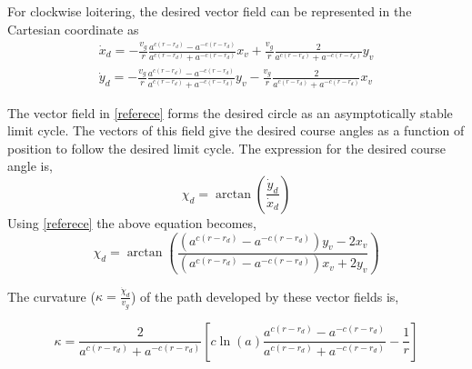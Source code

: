 \documentclass[Afour,sagev,times]{sagej}
\begin{document}
For clockwise loitering, the desired vector field can be represented in the Cartesian coordinate as
\begin{equation}\label{referece}
\begin{split}
\textstyle\dot{x}_{d}  =  - \frac{v_{g}}{r}\frac{{{a^{c(r - {r_d})}} - {a^{ - c(r - {r_d})}}}}{{{a^{c(r - {r_d})}} + {a^{ - c(r - {r_d})}}}}x_v +\frac{v_{g}}{r}\frac{2}{{{a^{c(r - {r_d})}} + {a^{ - c(r - {r_d})}}}}y_v \\
\textstyle\dot{y}_{d}  =  - \frac{v_{g}}{r}\frac{{{a^{c(r - {r_d})}} - {a^{ - c(r - {r_d})}}}}{{{a^{c(r - {r_d})}} + {a^{ - c(r - {r_d})}}}}y_v - \frac{v_{g}}{r}\frac{2}{{{a^{c(r - {r_d})}} + {a^{ - c(r - {r_d})}}}}x_v
\end{split}
\end{equation}

The vector field in \eqref{referece} forms the desired circle as an asymptotically stable limit cycle. The vectors of this field give the desired course angles as a function of position to follow the desired limit cycle. The expression for the desired course angle is,
\begin{equation}
{\chi _ {d}} = \arctan \left( {\frac{{\dot{y}_{d} }}{{\dot{x}_{d} }}} \right)
\end{equation}
Using \eqref{referece} the above equation becomes,
\begin{equation}
{\chi _{d}} = \arctan \left( {\frac{{\left( {{a^{c(r - {r_d})}} - {a^{ - c(r - {r_d})}}} \right)y_v - 2x_v}}{{\left( {{a^{c(r - {r_d})}} - {a^{ - c(r - {r_d})}}} \right)x_v + 2y_v}}} \right)
\end{equation}

The curvature ($\kappa = \frac{{{{\dot \chi }_d}}}{v_{g}}$) of the path developed by these vector fields is, 

\begin{equation}\label{eq15}
\kappa = \frac{2}{{{a^{c(r - {r_d})}} + {a^{ - c(r - {r_d})}}}}\left[ {c\ln (a)\frac{{{a^{c(r - {r_d})}} - {a^{ - c(r - {r_d})}}}}{{{a^{c(r - {r_d})}} + {a^{ - c(r - {r_d})}}}} - \frac{1}{r}} \right]
\end{equation}
\end{document}
